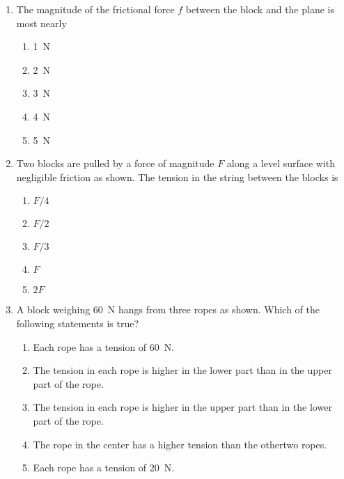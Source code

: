 \documentclass{../../../oss-apphys}
\begin{document}
\begin{multicols}{2}
\begin{enumerate}[resume,leftmargin=18pt]
  \item The magnitude of the frictional force $f$ between the block and the
    plane is most nearly
    \begin{enumerate}[noitemsep,topsep=0pt,leftmargin=18pt,label=(\Alph*)]
    \item\SI{1}{\newton}
    \item\SI{2}{\newton}
    \item\SI{3}{\newton}
    \item\SI{4}{\newton}
    \item\SI{5}{\newton}
    \end{enumerate}
    \label{fk}
    \columnbreak

  \item Two blocks are pulled by a force of magnitude $F$ along a level surface
    with negligible friction as shown. The tension in the string between the
    blocks is
    \begin{center}
      \vspace{-.1in}
    \end{center}
    \begin{enumerate}[noitemsep,topsep=0pt,leftmargin=18pt,label=(\Alph*)]
    \item $F/4$
    \item $F/2$
    \item $F/3$
    \item $F$
    \item $2F$
    \end{enumerate}
    
  \item A block weighing \SI{60}{\newton} hangs from three ropes as shown.
    Which of the following statements is true?
    \begin{center}
      \vspace{-.1in}
    \end{center}
    \begin{enumerate}[noitemsep,topsep=0pt,leftmargin=18pt,label=(\Alph*)]    
    \item Each rope has a tension of \SI{60}{\newton}.
    \item The tension in each rope is higher in the lower part than in the
      upper part of the rope.
    \item The tension in each rope is higher in the upper part than in the
      lower part of the rope.
    \item The rope in the center has a higher tension than the othertwo ropes.
    \item Each rope has a tension of \SI{20}{\newton}.
    \end{enumerate}
    

\end{enumerate}
\end{multicols}
\end{document}
